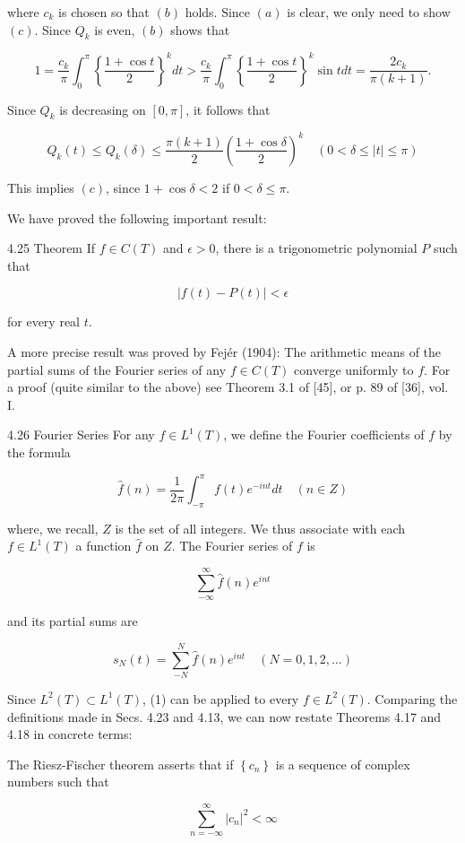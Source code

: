 \documentclass[10pt]{article}
\begin{document}
where $c_{k}$ is chosen so that $(b)$ holds. Since $(a)$ is clear, we only need to show $(c)$. Since $Q_{k}$ is even, $(b)$ shows that

$$
1=\frac{c_{k}}{\pi} \int_{0}^{\pi}\left\{\frac{1+\cos t}{2}\right\}^{k} d t>\frac{c_{k}}{\pi} \int_{0}^{\pi}\left\{\frac{1+\cos t}{2}\right\}^{k} \sin t d t=\frac{2 c_{k}}{\pi(k+1)} .
$$

Since $Q_{k}$ is decreasing on $[0, \pi]$, it follows that

$$
Q_{k}(t) \leq Q_{k}(\delta) \leq \frac{\pi(k+1)}{2}\left(\frac{1+\cos \delta}{2}\right)^{k} \quad(0<\delta \leq|t| \leq \pi)
$$

This implies $(c)$, since $1+\cos \delta<2$ if $0<\delta \leq \pi$.

We have proved the following important result:

4.25 Theorem If $f \in C(T)$ and $\epsilon>0$, there is a trigonometric polynomial $P$ such that

$$
|f(t)-P(t)|<\epsilon
$$

for every real $t$.

A more precise result was proved by Fejér (1904): The arithmetic means of the partial sums of the Fourier series of any $f \in C(T)$ converge uniformly to $f$. For a proof (quite similar to the above) see Theorem 3.1 of [45], or p. 89 of [36], vol. I.

4.26 Fourier Series For any $f \in L^{1}(T)$, we define the Fourier coefficients of $f$ by the formula

$$
\hat{f}(n)=\frac{1}{2 \pi} \int_{-\pi}^{\pi} f(t) e^{-i n t} d t \quad(n \in Z)
$$

where, we recall, $Z$ is the set of all integers. We thus associate with each $f \in L^{1}(T)$ a function $\hat{f}$ on $Z$. The Fourier series of $f$ is

$$
\sum_{-\infty}^{\infty} \hat{f}(n) e^{i n t}
$$

and its partial sums are

$$
s_{N}(t)=\sum_{-N}^{N} \hat{f}(n) e^{i n t} \quad(N=0,1,2, \ldots)
$$

Since $L^{2}(T) \subset L^{1}(T)$, (1) can be applied to every $f \in L^{2}(T)$. Comparing the definitions made in Secs. 4.23 and 4.13, we can now restate Theorems 4.17 and 4.18 in concrete terms:

The Riesz-Fischer theorem asserts that if $\left\{c_{n}\right\}$ is a sequence of complex numbers such that

$$
\sum_{n=-\infty}^{\infty}\left|c_{n}\right|^{2}<\infty
$$
\end{document}
